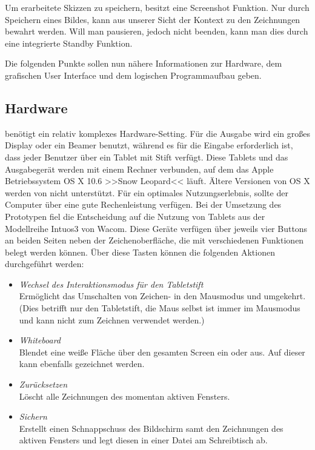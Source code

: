 \medskip Um erarbeitete Skizzen zu speichern, besitzt \scribbler eine Screenshot Funktion. Nur durch Speichern eines Bildes, kann aus unserer Sicht der Kontext zu den Zeichnungen bewahrt werden. Will man \scribbler pausieren, jedoch nicht beenden, kann man dies durch eine integrierte Standby Funktion.

\medskip Die folgenden Punkte sollen nun nähere Informationen zur Hardware, dem grafischen User Interface und dem logischen Programmaufbau geben. 

\subsection{Hardware} \label{ssec:hardware}
\scribbler benötigt ein relativ komplexes Hardware-Setting. Für die Ausgabe wird ein großes Display oder ein Beamer benutzt, während es für die Eingabe erforderlich ist, dass jeder Benutzer über ein Tablet mit Stift verfügt. Diese Tablets und das Ausgabegerät werden mit einem Rechner verbunden, auf dem das Apple Betriebssystem OS X 10.6 >>Snow Leopard<< läuft. Ältere Versionen von OS X werden von \scribbler nicht unterstützt. Für ein optimales Nutzungserlebnis, sollte der Computer über eine gute Rechenleistung verfügen. Bei der Umsetzung des Prototypen fiel die Entscheidung auf die Nutzung von Tablets aus der Modellreihe Intuos3 von Wacom. Diese Geräte verfügen über jeweils vier Buttons an beiden Seiten neben der Zeichenoberfläche, die mit verschiedenen Funktionen belegt werden können. Über diese Tasten können die folgenden Aktionen durchgeführt werden:

\begin{itemize}
	\item \emph{Wechsel des Interaktionsmodus für den Tabletstift}\\
	Ermöglicht das Umschalten von Zeichen- in den Mausmodus und umgekehrt. (Dies betrifft nur den Tabletstift, die Maus selbst ist immer im Mausmodus und kann nicht zum Zeichnen verwendet werden.)
	\item \emph{Whiteboard}\\
	Blendet eine weiße Fläche über den gesamten Screen ein oder aus. Auf dieser kann ebenfalls gezeichnet werden.
	\item \emph{Zurücksetzen}\\
	Löscht alle Zeichnungen des momentan aktiven Fensters.
	\item \emph{Sichern}\\
	Erstellt einen Schnappschuss des Bildschirm samt den Zeichnungen des aktiven Fensters und legt diesen in einer Datei am Schreibtisch ab.
\end{itemize}

